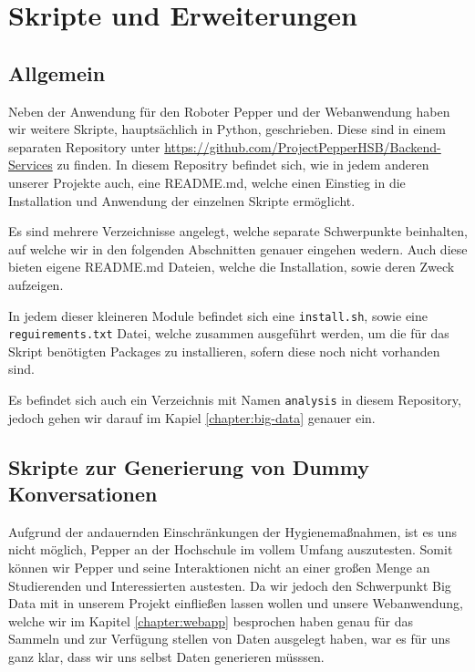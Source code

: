 \newcommand{\scripts}{Kapitel 8.}
\chapter{Skripte und Erweiterungen}
\label{chapter:scripts}
\lhead{\scripts \emph{Skripte und Erweiterungen}}

\section{Allgemein}
Neben der Anwendung für den Roboter Pepper und der Webanwendung haben wir weitere Skripte, hauptsächlich in Python, geschrieben. Diese sind in einem separaten Repository unter \href{https://github.com/ProjectPepperHSB/Backend-Services}{https://github.com/ProjectPepperHSB/Backend-Services} zu finden. In diesem Repositry befindet sich, wie in jedem anderen unserer Projekte auch, eine README.md, welche einen Einstieg in die Installation und Anwendung der einzelnen Skripte ermöglicht.

Es sind mehrere Verzeichnisse angelegt, welche separate Schwerpunkte beinhalten, auf welche wir in den folgenden Abschnitten genauer eingehen wedern. Auch diese bieten eigene README.md Dateien, welche die Installation, sowie deren Zweck aufzeigen.

In jedem dieser kleineren Module befindet sich eine \verb|install.sh|, sowie eine \verb|reguirements.txt| Datei, welche zusammen ausgeführt werden, um die für das Skript benötigten Packages zu installieren, sofern diese noch nicht vorhanden sind.

Es befindet sich auch ein Verzeichnis mit Namen \verb|analysis| in diesem Repository, jedoch gehen wir darauf im Kapiel \ref{chapter:big-data} genauer ein.\\

\section{Skripte zur Generierung von Dummy Konversationen}
\label{sec:dummy-data}
Aufgrund der andauernden Einschränkungen der Hygienemaßnahmen, ist es uns nicht möglich, Pepper an der Hochschule im vollem Umfang auszutesten. Somit können wir Pepper und seine Interaktionen nicht an einer großen Menge an Studierenden und Interessierten austesten. Da wir jedoch den Schwerpunkt Big Data mit in unserem Projekt einfließen lassen wollen und unsere Webanwendung, welche wir im Kapitel \ref{chapter:webapp} besprochen haben genau für das Sammeln und zur Verfügung stellen von Daten ausgelegt haben, war es für uns ganz klar, dass wir uns selbst Daten generieren müsssen.

